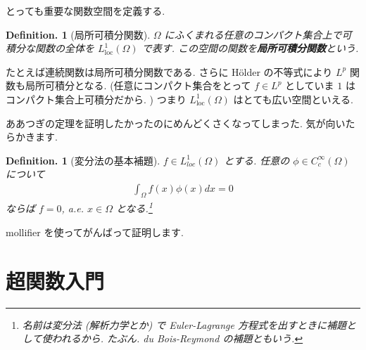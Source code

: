 \documentclass[openany, a4paper, oneside]{jsbook}
\theoremstyle{break}
\theoremstyle{breakdefn}
\newtheorem{defn}[thm]{Definition.}
\newcommand{\Loneloc}{L_{\mathrm{loc}}^1}
\begin{document}
とっても重要な関数空間を定義する.
\begin{defn}[局所可積分関数]
 $\Omega$ にふくまれる任意のコンパクト集合上で可積分な関数の全体を $\Loneloc (\Omega)$ で表す.
 この空間の関数を\textbf{局所可積分関数}という.
\end{defn}

たとえば連続関数は局所可積分関数である.
さらに H\"older の不等式により $L^p$ 関数も局所可積分となる.
(任意にコンパクト集合をとって $f\in L^p$ としていま $1$ はコンパクト集合上可積分だから. )
つまり $\Loneloc (\Omega)$ はとても広い空間といえる.

ああつぎの定理を証明したかったのにめんどくさくなってしまった.
気が向いたらかきます.

\begin{defn}[変分法の基本補題]
 $f\in L_{loc}^1 (\Omega)$ とする.
 任意の $\phi \in C_c^{\infty}(\Omega)$ について
 \begin{align}
  \int_{\Omega}f (x)\phi (x) dx = 0
 \end{align}
 ならば $f = 0$, a.e. $x \in \Omega$ となる.\footnote{名前は変分法 (解析力学とか) で Euler-Lagrange 方程式を出すときに補題として使われるから.
たぶん.
du Bois-Reymond の補題ともいう.
 }
\end{defn}

mollifier を使ってがんばって証明します.
\section{超関数入門}
\end{document}
